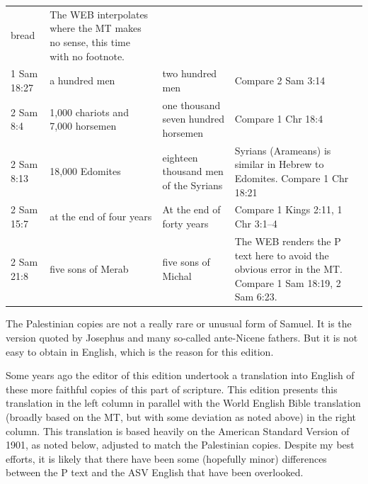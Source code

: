 {\begin{tabular}{p{}p{}p{}p{}}
                                                    bread&The WEB
                                                           interpolates
                                                           where the
                                                           MT makes no
                                                           sense, this
                                                           time with
                                                           no footnote.\\
  1 Sam 18:27&a hundred men&two hundred men&Compare 2 Sam 3:14\\
  2 Sam 8:4&1,000 chariots and 7,000 horsemen&one thousand seven
                                               hundred
                                               horsemen&Compare 1 Chr
                                                         18:4\\
  2 Sam 8:13&18,000 Edomites&eighteen thousand men of the
                              Syrians&Syrians (Arameans) is similar in
                                       Hebrew to Edomites. Compare 1
                                       Chr 18:21\\
  2 Sam 15:7&at the end of four years&At the end of forty
                                       years&Compare 1 Kings 2:11, 1
                                              Chr 3:1--4\\
  2 Sam 21:8&five sons of Merab&five sons of Michal&The WEB renders
                                                     the P text here
                                                     to avoid the
                                                     obvious error in
                                                     the MT. Compare 1
                                                     Sam 18:19, 2 Sam
                                                     6:23.
\end{tabular}
The Palestinian copies are not a really rare or unusual form of
Samuel. It is the version quoted by Josephus and many so-called
ante-Nicene fathers. But it is not easy to obtain in English, which is the reason
for this edition.

Some years ago the editor of this edition undertook a translation into
English of these more faithful copies of this part of scripture. This
edition presents this translation in the left column in parallel with
the World English Bible translation (broadly based on the MT, but with
  some deviation as noted above) in the right
column. This translation is based heavily on the American Standard
Version of 1901, as noted below, adjusted to match the Palestinian
copies. Despite my best efforts, it is likely that there have been
some (hopefully minor)
differences between the P text and the ASV English that have been
overlooked.

}
